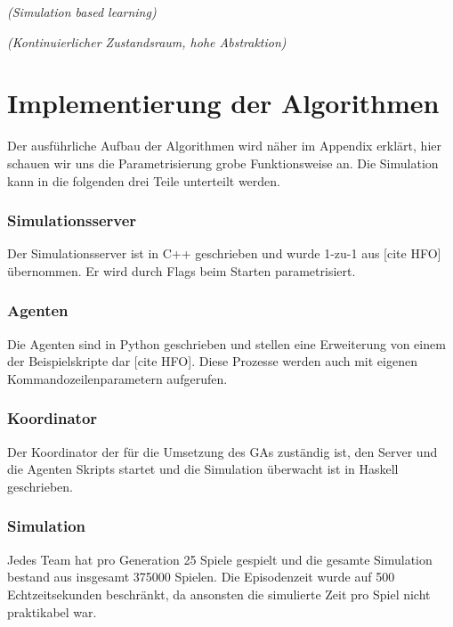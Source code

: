             \begin{center} \textit{(Simulation based learning)} \end{center}
            \begin{center} \textit{(Kontinuierlicher Zustandsraum, hohe Abstraktion)} \end{center}

    \section{Implementierung der Algorithmen}
        Der ausführliche Aufbau der Algorithmen wird näher im Appendix erklärt, hier schauen wir uns die Parametrisierung grobe Funktionsweise an. Die Simulation kann in die folgenden drei Teile unterteilt werden.

        \subsubsection*{Simulationsserver}
        Der Simulationsserver ist in C++ geschrieben und wurde 1-zu-1 aus [cite HFO] übernommen. Er wird durch Flags beim Starten parametrisiert.

        \subsubsection*{Agenten}
        Die Agenten sind in Python geschrieben und stellen eine Erweiterung von einem der Beispielskripte dar [cite HFO]. Diese Prozesse werden auch mit eigenen Kommandozeilenparametern aufgerufen.

        \subsubsection*{Koordinator}
        Der Koordinator der für die Umsetzung des GAs zuständig ist, den Server und die Agenten Skripts startet und die Simulation überwacht ist in Haskell geschrieben.\\

        \subsubsection*{Simulation}
        Jedes Team hat pro Generation 25 Spiele gespielt und die gesamte Simulation bestand aus insgesamt 375000 Spielen.
        Die Episodenzeit wurde auf 500 Echtzeitsekunden beschränkt, da ansonsten die simulierte Zeit pro Spiel nicht praktikabel war. \\

